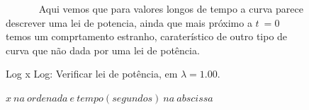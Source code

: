 \documentclass[pdftex,12pt,a4paper]{article}
\begin{document}
\begin{figure}
~~~~~~ Aqui vemos que para valores longos de tempo a curva parece descrever uma lei de potencia, ainda que mais próximo a $t\ = 0$ temos um comprtamento estranho, caraterístico de outro tipo de curva que não dada por uma lei de potência.

\centering
\caption{Log x Log: Verificar lei de potência, em $\lambda = 1.00$.}
\caption*{$x\ na\ ordenada\ e\ tempo(segundos)\ na\ abscissa$}
\end{figure}
\end{document}
